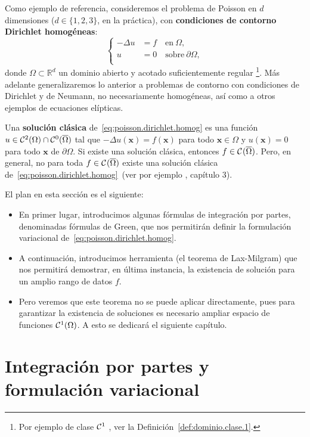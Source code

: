 \documentclass[11pt]{report}
\theoremstyle{plain}
\theoremstyle{definition}
\newcommand{\R}{\ensuremath{\mathbb{R}}}
\newcommand{\xx}{\ensuremath{\mathbf{x}}\xspace}
\newcommand{\en}{\quad\text{en}\ }
\newcommand{\sobre}{\quad\text{sobre}\ }
\newcommand{\classC}[2]{%
  \ensuremath{
   \ifthenelse{\equal{#2}{}}
    {\mathcal{C}^{#1}}
    {\mathcal{C}^{#1}(#2)}
  }
}
\newcommand{\Cont}[1]{\classC{}{#1}}
\begin{document}
Como ejemplo de referencia, consideremos el problema de Poisson en $d$ dimensiones
($d\in\{1,2,3\}$, en la práctica), con \textbf{condiciones de contorno Dirichlet homogéneas}:
\begin{equation}
	\left\{
	\begin{aligned}
		-\Delta u & = f \en{\Omega},            \\
		u         & = 0 \sobre{\partial\Omega}, \\
	\end{aligned}
	\right.
	\label{eq:poisson.dirichlet.homog}
\end{equation}
donde  $\Omega\subset\R^d$ un dominio abierto y acotado suficientemente regular%
\footnote{Por ejemplo de clase \classC{1}{}, ver la Definición~\ref{def:dominio.clase.1}.}.
Más adelante generalizaremos lo anterior a problemas de contorno con condiciones de Dirichlet y de Neumann, no necesariamente homogéneas, así como a otros ejemplos de ecuaciones elípticas.

Una \textbf{solución clásica} de~\eqref{eq:poisson.dirichlet.homog} es una función $u\in\classC2\Omega \cap \classC0{\overline\Omega
}$ tal que $-\Delta u(\xx)  = f(\xx)$ para todo $\xx\in\Omega$ y $u(\xx)=0$ para todo $\xx$ de $\partial\Omega$. Si existe una solución clásica, entonces $f\in\Cont{\overline\Omega}$. Pero, en general, no para toda $f\in\Cont{\overline\Omega}$ existe una solución clásica de~\eqref{eq:poisson.dirichlet.homog}~(ver por ejemplo \cite{allaire2007numerical}, capítulo 3).

El plan en esta sección es el siguiente:
\begin{itemize}
	\item En primer lugar, introducimos algunas fórmulas de integración por partes, denominadas fórmulas de Green, que nos permitirán definir la formulación variacional de~\eqref{eq:poisson.dirichlet.homog}.
	\item A continuación, introducimos  herramienta (el teorema de Lax-Milgram) que nos permitirá demostrar, en última instancia, la existencia de solución para un amplio rango de datos $f$. 
	\item Pero veremos que este teorema no se puede aplicar directamente, pues para garantizar la existencia de soluciones es necesario ampliar espacio de funciones $\classC1\Omega$. A esto se dedicará el siguiente capítulo.
\end{itemize}

\section{Integración por partes y formulación variacional}
\end{document}
